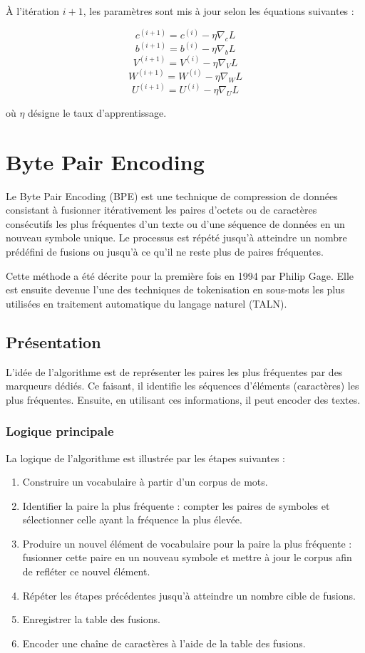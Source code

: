\documentclass[12pt,a4paper]{report}
\begin{document}
À l’itération $i+1$, les paramètres sont mis à jour selon les équations suivantes :

\[
c^{(i+1)} = c^{(i)} - \eta \nabla_c L
\]
\[
b^{(i+1)} = b^{(i)} - \eta \nabla_b L
\]
\[
V^{(i+1)} = V^{(i)} - \eta \nabla_V L
\]
\[
W^{(i+1)} = W^{(i)} - \eta \nabla_W L
\]
\[
U^{(i+1)} = U^{(i)} - \eta \nabla_U L
\]

où $\eta$ désigne le taux d’apprentissage.
	
	
	\chapter{Byte Pair Encoding}
	
	Le Byte Pair Encoding (BPE) est une technique de compression de données consistant à fusionner itérativement les paires d’octets ou de caractères consécutifs les plus fréquentes d’un texte ou d’une séquence de données en un nouveau symbole unique. Le processus est répété jusqu’à atteindre un nombre prédéfini de fusions ou jusqu’à ce qu’il ne reste plus de paires fréquentes.
	
	Cette méthode a été décrite pour la première fois en 1994 par Philip Gage. Elle est ensuite devenue l’une des techniques de tokenisation en sous-mots les plus utilisées en traitement automatique du langage naturel (TALN).
	
	\section{Présentation}
	
	L’idée de l’algorithme est de représenter les paires les plus fréquentes par des marqueurs dédiés. Ce faisant, il identifie les séquences d’éléments (caractères) les plus fréquentes. Ensuite, en utilisant ces informations, il peut encoder des textes.
	\subsection{Logique principale}
	La logique de l’algorithme est illustrée par les étapes suivantes :
	
	\begin{enumerate}
		\item Construire un vocabulaire à partir d’un corpus de mots.
		
		\item Identifier la paire la plus fréquente : compter les paires de symboles et sélectionner celle ayant la fréquence la plus élevée.
		
		\item Produire un nouvel élément de vocabulaire pour la paire la plus fréquente : fusionner cette paire en un nouveau symbole et mettre à jour le corpus afin de refléter ce nouvel élément.
		
		\item Répéter les étapes précédentes jusqu’à atteindre un nombre cible de fusions.
		
		\item Enregistrer la table des fusions.
		
		\item Encoder une chaîne de caractères à l’aide de la table des fusions.
	\end{enumerate}
	
\end{document}
